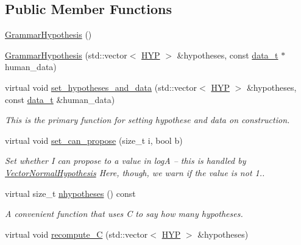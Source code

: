 \subsection*{Public Member Functions}
\begin{DoxyCompactItemize}
\item 
\hyperlink{class_grammar_hypothesis_a83e43512aae4bfcbd0e3907a62c71132}{Grammar\+Hypothesis} ()
\item 
\hyperlink{class_grammar_hypothesis_af74bd80ebd8d4d1f2e16507826af5465}{Grammar\+Hypothesis} (std\+::vector$<$ \hyperlink{class_grammar_hypothesis_a28fc99df28de741179719c94ecd77699}{H\+YP} $>$ \&hypotheses, const \hyperlink{class_bayesable_aa2788c4d7718c0a824e1d28c4c98f921}{data\+\_\+t} $\ast$human\+\_\+data)
\item 
virtual void \hyperlink{class_grammar_hypothesis_a4073539c064e62f00e77998a04a693cb}{set\+\_\+hypotheses\+\_\+and\+\_\+data} (std\+::vector$<$ \hyperlink{class_grammar_hypothesis_a28fc99df28de741179719c94ecd77699}{H\+YP} $>$ \&hypotheses, const \hyperlink{class_bayesable_aa2788c4d7718c0a824e1d28c4c98f921}{data\+\_\+t} \&human\+\_\+data)
\begin{DoxyCompactList}\small\item\em This is the primary function for setting hypothese and data on construction. \end{DoxyCompactList}\item 
virtual void \hyperlink{class_grammar_hypothesis_af658323081d132788bb5bebbd07c93e8}{set\+\_\+can\+\_\+propose} (size\+\_\+t i, bool b)
\begin{DoxyCompactList}\small\item\em Set whether I can propose to a value in logA -- this is handled by \hyperlink{class_vector_normal_hypothesis}{Vector\+Normal\+Hypothesis} Here, though, we warn if the value is not 1.. \end{DoxyCompactList}\item 
virtual size\+\_\+t \hyperlink{class_grammar_hypothesis_a887f646d5c07a485721d7b89bb166274}{nhypotheses} () const
\begin{DoxyCompactList}\small\item\em A convenient function that uses C to say how many hypotheses. \end{DoxyCompactList}\item 
virtual void \hyperlink{class_grammar_hypothesis_a6a1fadc201aa1ab1c9fe32102886ae2c}{recompute\+\_\+C} (std\+::vector$<$ \hyperlink{class_grammar_hypothesis_a28fc99df28de741179719c94ecd77699}{H\+YP} $>$ \&hypotheses)

\end{DoxyCompactItemize}
